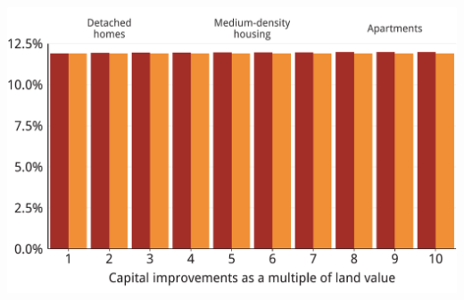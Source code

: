 \documentclass[tikz]{standalone}\usepackage[]{graphicx}\usepackage[]{color}
\newenvironment{knitrout}{}{} %
\begin{document}
\begin{knitrout}
\color{fgcolor}
\includegraphics[width=11.000in,height=7.00in]{./Property-taxes/atlas/figure/PROP-Figure9-1} 

\end{knitrout}
\end{document}
